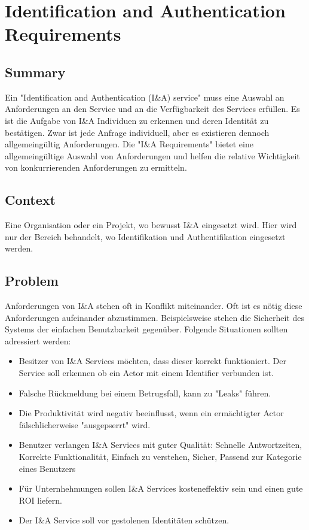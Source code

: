 \chapter{Identification and Authentication Requirements}

\section{Summary}
Ein "Identification and Authentication (I\&A) service" muss eine Auswahl an Anforderungen an den Service und an die Verfügbarkeit des Services erfüllen. Es ist die Aufgabe von I\&A Individuen zu erkennen und deren Identität zu bestätigen. Zwar ist jede Anfrage individuell, aber es existieren dennoch allgemeingültig Anforderungen.
Die "I\&A Requirements" bietet eine allgemeingültige Auswahl von Anforderungen und helfen die relative Wichtigkeit von konkurrierenden Anforderungen zu ermitteln.

\section{Context}
Eine Organisation oder ein Projekt, wo bewusst I\&A eingesetzt wird. Hier wird nur der Bereich behandelt, wo Identifikation und Authentifikation eingesetzt werden.

\section{Problem}
Anforderungen von I\&A stehen oft in Konflikt miteinander. Oft ist es nötig diese Anforderungen aufeinander abzustimmen. Beispielsweise stehen die Sicherheit des Systems der einfachen Benutzbarkeit gegenüber. Folgende Situationen sollten adressiert werden:
\begin{itemize}
  \item Besitzer von I\&A Services möchten, dass dieser korrekt funktioniert. Der Service soll erkennen ob ein Actor mit einem Identifier verbunden ist.
  \item Falsche Rückmeldung bei einem Betrugsfall, kann zu "Leaks" führen.
  \item Die Produktivität wird negativ beeinflusst, wenn ein ermächtigter Actor fälschlicherweise "ausgepserrt" wird.
  \item Benutzer verlangen I\&A Services mit guter Qualität: Schnelle Antwortzeiten, Korrekte Funktionalität, Einfach zu verstehen, Sicher, Passend zur Kategorie eines Benutzers
  \item Für Unternhehmungen sollen I\&A Services kosteneffektiv sein und einen gute ROI liefern.
  \item Der I\&A Service soll vor gestolenen Identitäten schützen.
\end{itemize}


